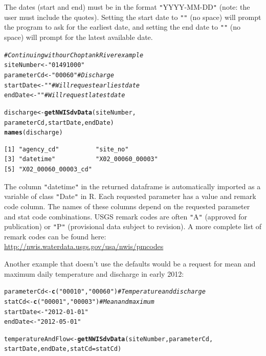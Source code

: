 \documentclass[a4paper,11pt]{article}\usepackage[]{graphicx}\usepackage[]{color}
\makeatletter
\newcommand{\hlstr}[1]{\textcolor[rgb]{0.192,0.494,0.8}{#1}}%
\newcommand{\hlcom}[1]{\textcolor[rgb]{0.678,0.584,0.686}{\textit{#1}}}%
\newcommand{\hlstd}[1]{\textcolor[rgb]{0.345,0.345,0.345}{#1}}%
\newcommand{\hlkwb}[1]{\textcolor[rgb]{0.69,0.353,0.396}{#1}}%
\newcommand{\hlkwc}[1]{\textcolor[rgb]{0.333,0.667,0.333}{#1}}%
\newcommand{\hlkwd}[1]{\textcolor[rgb]{0.737,0.353,0.396}{\textbf{#1}}}%
\newenvironment{kframe}{%
 \def\at@end@of@kframe{}%
 \ifinner\ifhmode%
  \def\at@end@of@kframe{\end{minipage}}%
  \begin{minipage}{\columnwidth}%
 \fi\fi%
 \def\FrameCommand##1{\hskip\@totalleftmargin \hskip-\fboxsep
 \colorbox{shadecolor}{##1}\hskip-\fboxsep
     \hskip-\linewidth \hskip-\@totalleftmargin \hskip\columnwidth}%
 \MakeFramed {\advance\hsize-\width
   \@totalleftmargin\z@ \linewidth\hsize
   \@setminipage}}%
 {\par\unskip\endMakeFramed%
 \at@end@of@kframe}
\newenvironment{knitrout}{}{} %
\makeatother
\begin{document}
The dates (start and end) must be in the format \texttt{"}YYYY-MM-DD\texttt{"} (note: the user must include the quotes).  Setting the start date to \texttt{"}\texttt{"} (no space) will prompt the program to ask for the earliest date, and setting the end date to \texttt{"}\texttt{"} (no space) will prompt for the latest available date.

\begin{knitrout}
\color{fgcolor}\begin{kframe}
\begin{alltt}
\hlcom{# Continuing with our Choptank River example}
\hlstd{siteNumber} \hlkwb{<-} \hlstr{"01491000"}
\hlstd{parameterCd} \hlkwb{<-} \hlstr{"00060"}  \hlcom{# Discharge}
\hlstd{startDate} \hlkwb{<-} \hlstr{""}  \hlcom{# Will request earliest date}
\hlstd{endDate} \hlkwb{<-} \hlstr{""} \hlcom{# Will request latest date}

\hlstd{discharge} \hlkwb{<-} \hlkwd{getNWISdvData}\hlstd{(siteNumber,}
                    \hlstd{parameterCd, startDate, endDate)}
\hlkwd{names}\hlstd{(discharge)}
\end{alltt}
\begin{verbatim}
[1] "agency_cd"          "site_no"           
[3] "datetime"           "X02_00060_00003"   
[5] "X02_00060_00003_cd"
\end{verbatim}
\end{kframe}
\end{knitrout}

The column \texttt{"}datetime\texttt{"} in the returned dataframe is automatically imported as a variable of class \texttt{"}Date\texttt{"} in R. Each requested parameter has a value and remark code column.  The names of these columns depend on the requested parameter and stat code combinations. USGS remark codes are often \texttt{"}A\texttt{"} (approved for publication) or \texttt{"}P\texttt{"} (provisional data subject to revision). A more complete list of remark codes can be found here:
\url{http://nwis.waterdata.usgs.gov/usa/nwis/pmcodes}

Another example that doesn't use the defaults would be a request for mean and maximum daily temperature and discharge in early 2012:
\begin{knitrout}
\color{fgcolor}\begin{kframe}
\begin{alltt}
\hlstd{parameterCd} \hlkwb{<-} \hlkwd{c}\hlstd{(}\hlstr{"00010"}\hlstd{,}\hlstr{"00060"}\hlstd{)}  \hlcom{# Temperature and discharge}
\hlstd{statCd} \hlkwb{<-} \hlkwd{c}\hlstd{(}\hlstr{"00001"}\hlstd{,}\hlstr{"00003"}\hlstd{)}  \hlcom{# Mean and maximum}
\hlstd{startDate} \hlkwb{<-} \hlstr{"2012-01-01"}
\hlstd{endDate} \hlkwb{<-} \hlstr{"2012-05-01"}

\hlstd{temperatureAndFlow} \hlkwb{<-} \hlkwd{getNWISdvData}\hlstd{(siteNumber, parameterCd,}
        \hlstd{startDate, endDate,} \hlkwc{statCd}\hlstd{=statCd)}
\end{alltt}
\end{kframe}
\end{knitrout}
\end{document}
